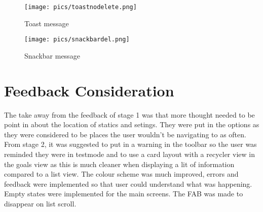 \documentclass[12pt]{report}
\begin{document}
\begin{figure}[!htb]
  \texttt{[image: pics/toastnodelete.png]}
  \caption{Toast message}
  \label{fig:toastnodelete}
\endminipage\hfill
{}
  \texttt{[image: pics/snackbardel.png]}
  \caption{Snackbar message}\label{fig:snackbardel}
\endminipage
\end{figure}

\section{Feedback Consideration}

The take away from the feedback of stage 1 was that more thought needed to be point in about the location of statics and setings. They were put in the options as they were considered to be places the user wouldn't be navigating to as often. 
From stage 2, it was suggested to put in a warning in the toolbar so the user was reminded they were in testmode and to use a card layout with a recycler view in the goals view as this is much cleaner when displaying a lit of information compared to a list view. The colour scheme was much improved, errors and feedback were implemented so that user could understand what was happening. Empty states were implemented for the main screens. The FAB was made to disappear on list scroll. 
\end{document}
